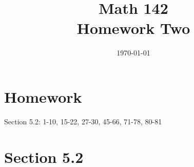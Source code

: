 \documentclass{exam}
\author{}
\date{\today}
\title{Math 142 \\ Homework Two}
\begin{document}
  \maketitle

  \section{Homework}
  Section 5.2: 1-10, 15-22, 27-30, 45-66, 71-78, 80-81


  \ifprintanswers
    \section{Section 5.2}
\end{document}
